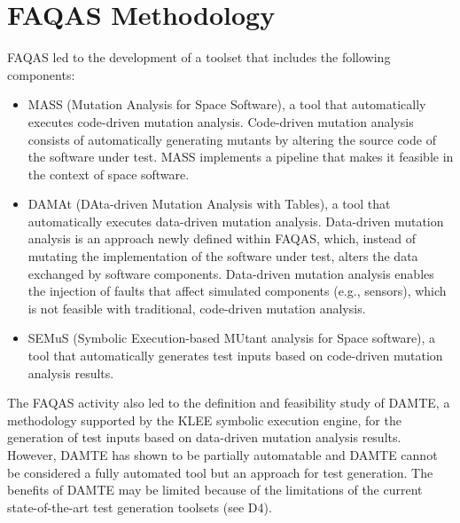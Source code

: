 
\chapter{FAQAS Methodology}
\label{chapter:methodology}

FAQAS led to the development of a toolset that includes the following components:
\begin{itemize}
\item MASS (Mutation Analysis for Space Software), a tool that automatically executes code-driven mutation analysis. Code-driven mutation analysis consists of automatically generating mutants by altering the source code of the software under test. MASS implements a pipeline that makes it feasible in the context of space software. 
\item DAMAt (DAta-driven Mutation Analysis with Tables), a tool that automatically executes data-driven mutation analysis. Data-driven mutation analysis is an approach newly defined within FAQAS, which, instead of mutating the implementation of the software under test, alters the data exchanged by software components. Data-driven mutation analysis enables the injection of faults that affect simulated components (e.g., sensors), which is not feasible with traditional, code-driven mutation analysis.
\item SEMuS (Symbolic Execution-based MUtant analysis for Space software), a tool that automatically generates test inputs based on code-driven mutation analysis results. 
\end{itemize}

The FAQAS activity also led to the definition and feasibility study of DAMTE, a methodology supported by the KLEE symbolic execution engine, for the generation of test inputs based on data-driven mutation analysis results. However, DAMTE has shown to be partially automatable and DAMTE cannot be considered a fully automated tool but an approach for test generation. The benefits of DAMTE may be limited because of the limitations of the current state-of-the-art test generation toolsets (see D4).

%

